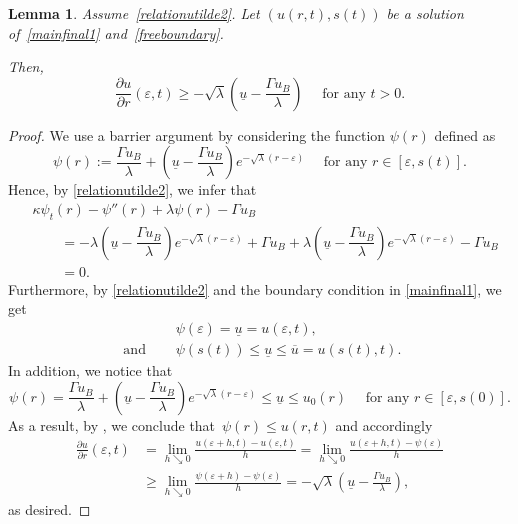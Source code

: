 \documentclass[12pt,a4paper,intlimits,sumlimits]{amsart}
\theoremstyle{definition}
\theoremstyle{plain}
\newtheorem{lemma}[definition]{Lemma}
\numberwithin{equation}{section}
\renewcommand{\le}{\leqslant}
\renewcommand{\ge}{\geqslant}
\begin{document}
\begin{lemma}\label{barrieradasotto}
Assume~\eqref{relationutilde2}.
Let $(u(r,t), s(t))$ be a solution of~\eqref{mainfinal1} and~\eqref{freeboundary}. 

Then, 
\begin{equation}\label{pqkd-32i5mb96n-8mnbJHvm689mbS8}
\dfrac{\partial u}{\partial r}(\varepsilon, t) \ge -\sqrt{\lambda}\left(\underline u-\frac{\Gamma u_B}{\lambda} \right)\quad\mbox{ for any } t>0.
\end{equation}
\end{lemma}

\begin{proof}
We use a barrier argument by considering the function $\psi(r)$ defined as
\begin{equation}\label{òpèloiuytdreszawxrdcftvbhjnkm}
\psi(r):=\dfrac{\Gamma u_B}{\lambda}+\left(\underline u-\dfrac{\Gamma u_B}{\lambda}\right) e^{-\sqrt{\lambda}(r-\varepsilon)}\quad\mbox{ for any } r\in [\varepsilon, s(t)].
\end{equation}
Hence, by \eqref{relationutilde2}, we infer that
\[
\begin{split}
&\kappa\psi_t(r)-\psi''(r) +\lambda\psi(r)-\Gamma u_B \\
&\qquad=-\lambda\left(\underline u-\dfrac{\Gamma u_B}{\lambda}\right)e^{-\sqrt{\lambda}(r-\varepsilon)} +\Gamma u_B +\lambda\left(\underline u-\dfrac{\Gamma u_B}{\lambda}\right)e^{-\sqrt{\lambda}(r-\varepsilon)} -\Gamma u_B\\
&\qquad= 0.
\end{split}
\]
Furthermore, by \eqref{relationutilde2} and the boundary condition in \eqref{mainfinal1},  we get
\[
\begin{split}
&\psi(\varepsilon) =\underline u= u(\varepsilon, t),\\[7pt]
\mbox{ and }\quad &\psi(s(t))\le\underline u\le\overline u =u(s(t), t).
\end{split}
\]
In addition,  we notice that
\[
\psi(r)=\dfrac{\Gamma u_B}{\lambda}+\left(\underline u-\dfrac{\Gamma u_B}{\lambda}\right) e^{-\sqrt{\lambda}(r-\varepsilon)} \le\underline u\le u_0(r)\quad\mbox{ for any } r\in [\varepsilon, s(0)].
\]
As a result, by \cite[Corollary~2.5]{MR1465184},
we conclude that~$\psi(r)\le u(r,t)$ and accordingly
\[
\begin{split}
\frac{\partial u}{\partial r}(\varepsilon,t)&=\lim_{h\searrow0}\frac{u(\varepsilon +h, t)-u(\varepsilon, t)}{h}=\lim_{h\searrow0}\frac{u(\varepsilon +h, t)-\psi(\varepsilon)}{h}\\
&\ge\lim_{h\searrow0}\frac{\psi(\varepsilon +h)-\psi(\varepsilon)}{h}= -\sqrt{\lambda}\left(\underline u-\frac{\Gamma u_B}{\lambda} \right),
\end{split}
\]
as desired.
\end{proof}
\end{document}
